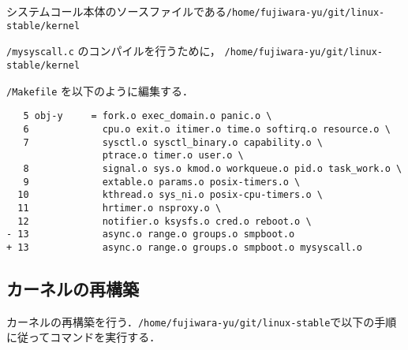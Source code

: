 \documentclass[12pt]{jsarticle}
\begin{document}
\begin{enumerate}
システムコール本体のソースファイルである\verb|/home/fujiwara-yu/git/linux-stable/kernel|

\verb|/mysyscall.c| のコンパイルを行うために，
\verb|/home/fujiwara-yu/git/linux-stable/kernel|

\verb|/Makefile| を以下のように編集する．
\begin{verbatim}
   5 obj-y     = fork.o exec_domain.o panic.o \
   6             cpu.o exit.o itimer.o time.o softirq.o resource.o \
   7             sysctl.o sysctl_binary.o capability.o \
                 ptrace.o timer.o user.o \
   8             signal.o sys.o kmod.o workqueue.o pid.o task_work.o \
   9             extable.o params.o posix-timers.o \
  10             kthread.o sys_ni.o posix-cpu-timers.o \
  11             hrtimer.o nsproxy.o \
  12             notifier.o ksysfs.o cred.o reboot.o \
- 13             async.o range.o groups.o smpboot.o
+ 13             async.o range.o groups.o smpboot.o mysyscall.o
\end{verbatim}



\end{enumerate}

\subsection{カーネルの再構築}
カーネルの再構築を行う．\verb|/home/fujiwara-yu/git/linux-stable|で以下の手順に従ってコマンドを実行する．
\end{document}
